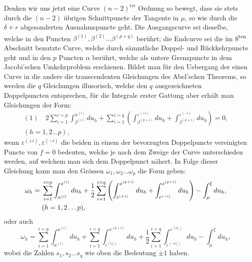 \documentclass[10pt]{article}
\begin{document}
Denken wir uns jetzt eine Curve \((n-2)^{\mathrm{ter}}\) Ordnung so bewegt, dass sie stets durch die \((n-2)\) übrigen Schnittpuncte der Tangente in \(\mu\), so wie durch die \(\delta+r\) abgesonderten Ausnahmspuncte geht. Die Ausgangscurve sei dieselbe, welche in den Puncten \(\beta^{(1)},\beta^{(2)}\ldots\beta^{(p+q)}\) berührt; die Endcurve sei die im 8\textsuperscript{ten} Abschnitt benutzte Curve, welche durch sämmtliche Doppel- und Rückkehrpuncte geht und in den \(p\) Puncten \(\alpha\) berührt, welche als untere Grenzpuncte in dem Jacobi'schen Umkehrproblem erschienen. Bildet man für den Uebergang der einen Curve in die andere die transcendenten Gleichungen des Abel'schen Theorems, so werden die \(q\) Gleichungen illusorisch, welche den \(q\) ausgezeichneten Doppelpuncten entsprechen, für die Integrale erster Gattung aber erhält man Gleichungen der Form:
\[
\begin{aligned}
(1)\quad
2\sum_{i=1}^{i=p}\int_{\beta^{(i)}}^{\alpha^{(i)}}du_h
+\sum_{i=1}^{i=q}\left(
\int_{\beta^{(p+i)}}^{\varepsilon^{(+i)}}du_h
+\int_{\beta^{(p+i)}}^{\varepsilon^{(-i)}}du_h\right)=0,\\
(h=1,2\ldots p),
\end{aligned}
\]
wenn \(\varepsilon^{(+i)},\varepsilon^{(-i)}\) die beiden in einem der bevorzugten Doppelpuncte vereinigten Puncte von \(f=0\) bedeuten, welche je nach dem Zweige der Curve unterschieden werden, auf welchem man sich dem Doppelpunct nähert. In Folge dieser Gleichung kann man den Grössen \(\omega_1,\omega_2\ldots\omega_p\) die Form geben:
\[
\begin{aligned}
\omega_h={}&\sum_{i=1}^{i=p}\int_{\alpha^{(i)}}^{x^{(i)}}du_h
+\frac12\sum_{i=1}^{i=q}\left(\int_{\varepsilon^{(+i)}}^{x^{(p+i)}}du_h+
\int_{\varepsilon^{(-i)}}^{x^{(p+i)}}du_h\right)-\int_{\mu}^{\xi}du_h,\\
&\hfill (h=1,2\ldots p),
\end{aligned}
\]
oder auch
\[
\omega_h=\sum_{i=1}^{i=p}\int_{\alpha^{(i)}}^{x^{(i)}}du_h
+\sum_{i=1}^{i=q}\int_{\varepsilon^{(is_i)}}^{x^{(p+i)}}du_h
+\frac12\sum_{i=1}^{i=q}\int_{\varepsilon^{(-is_i)}}^{\varepsilon^{(is_i)}}du_h
-\int_{\mu}^{\xi}du_h,
\]
wobei die Zahlen \(s_1,s_2\ldots s_q\) wie oben die Bedeutung \(\pm1\) haben.
\end{document}
